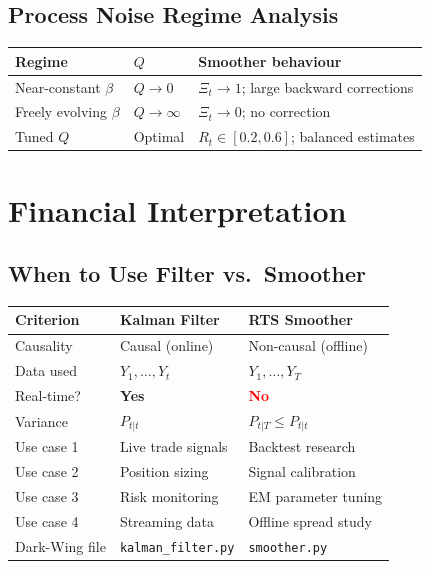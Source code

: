 \documentclass[10pt,a4paper,twocolumn]{article}
\begin{document}
\subsection{Process Noise Regime Analysis}

\begin{center}\small
\begin{tabular}{@{}lll@{}}
\toprule
Regime & $Q$ & Smoother behaviour\\\midrule
Near-constant $\beta$ & $Q \to 0$ & $\Xi_t \to 1$; large backward corrections\\
Freely evolving $\beta$ & $Q \to \infty$ & $\Xi_t \to 0$; no correction\\
Tuned $Q$ & Optimal & $R_t \in [0.2,0.6]$; balanced estimates\\
\bottomrule
\end{tabular}
\end{center}

\section{Financial Interpretation}

\subsection{When to Use Filter vs.\ Smoother}

\begin{center}\small
\begin{tabular}{@{}p{1.7cm}p{2.3cm}p{2.3cm}@{}}
\toprule
\textbf{Criterion} & \textbf{Kalman Filter} & \textbf{RTS Smoother}\\\midrule
Causality       & Causal (online)        & Non-causal (offline)\\
Data used       & $Y_1,\ldots,Y_t$       & $Y_1,\ldots,Y_T$\\
Real-time?      & \textcolor{greenframe}{\textbf{Yes}}
                & \textcolor{red}{\textbf{No}}\\
Variance        & $P_{t|t}$              & $P_{t|T} \leq P_{t|t}$\\\midrule
Use case 1      & Live trade signals     & Backtest research\\
Use case 2      & Position sizing        & Signal calibration\\
Use case 3      & Risk monitoring        & EM parameter tuning\\
Use case 4      & Streaming data         & Offline spread study\\\midrule
Dark-Wing file  & \texttt{kalman\_filter.py}
                & \texttt{smoother.py}\\
\bottomrule
\end{tabular}
\end{center}
\end{document}

